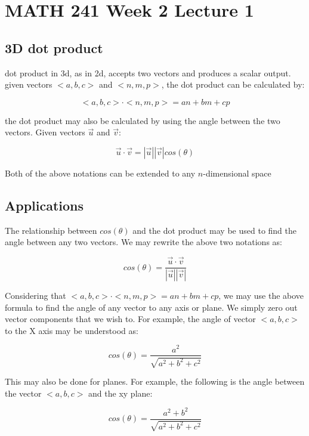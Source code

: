 \documentclass[12pt]{report}
\begin{document}
\chapter*{MATH 241 Week 2 Lecture 1}
\section*{3D dot product}
dot product in 3d, as in 2d, accepts two vectors and produces a scalar output. given vectors $<a,b,c>$ and $<n,m,p>$, the dot product can be calculated by:

$$<a,b,c> \cdot <n,m,p> = an + bm + cp$$

the dot product may also be calculated by using the angle between the two vectors. Given vectors $\vec{u}$ and $\vec{v}$:

$$\vec{u} \cdot \vec{v} = |\vec{u}| |\vec{v}| cos(\theta)$$

Both of the above notations can be extended to any $n$-dimensional space

\section*{Applications}
The relationship between $cos(\theta)$ and the dot product may be used to find the angle between any two vectors. We may rewrite the above two notations as:

$$cos(\theta) = \frac{\vec{u} \cdot \vec{v}}{|\vec{u}| |\vec{v}|}$$

Considering that $<a,b,c> \cdot <n,m,p> = an + bm + cp$, we may use the above formula to find the angle of any vector to any axis or plane. We simply zero out vector components that we wish to. For example, the angle of vector $<a,b,c>$ to the X axis may be understood as:

$$cos(\theta) = \frac{a^2}{\sqrt{a^2 + b^2 + c^2}}$$

This may also be done for planes. For example, the following is the angle between the vector $<a,b,c>$ and the xy plane:

$$cos(\theta) = \frac{a^2+b^2}{\sqrt{a^2 + b^2 + c^2}}$$
\end{document}
